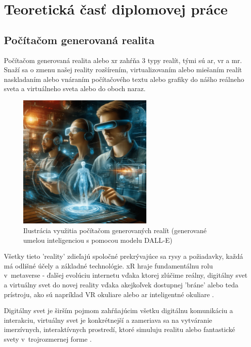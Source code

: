 \section{Teoretická časť diplomovej práce}

\subsection{Počítačom generovaná realita}

Počítačom generovaná realita alebo \gls{xr} zahŕňa 3 typy realít, tými sú \gls{ar}, \gls{vr} a \gls{mr}. Snaží sa o zmenu našej reality rozšírením, virtualizovaním alebo miešaním realít naskladaním alebo vnáraním počítačového textu alebo grafiky do nášho reálneho sveta a virtuálneho sveta alebo do oboch naraz. 

\begin{figure}[h]
  \centering
  \includegraphics[width=0.6\textwidth]{img/Pocitacom_generovana_realita.png}
  \caption{Ilustrácia využitia počítačom generovaných realít (generované umelou inteligenciou s pomocou modelu DALL-E)}
  \label{fig:poc_gen_real}
\end{figure}

Všetky tieto 'reality' zdieľajú spoločné prekrývajúce sa rysy a požiadavky, každá má odlišné účely a základné technológie. xR hraje fundamentálnu rolu v~metaverse - ďalšej evolúciu internetu vďaka ktorej zlúčime reálny, digitálny svet a virtuálny svet do novej reality vďaka akejkoľvek dostupnej 'bráne' alebo teda prístroju, ako sú napríklad VR okuliare alebo \gls{ar} inteligentné okuliare \cite{armXR2022}. %

Digitálny svet je širším pojmom zahŕňajúcim všetku digitálnu komunikáciu a interakciu, virtuálny svet je konkrétnejší a zameriava sa na vytváranie imerzívnych, interaktívnych prostredí, ktoré simuluju realitu alebo fantastické svety v~trojrozmernej forme \cite{redkiwi2024digitalvirtual}.

